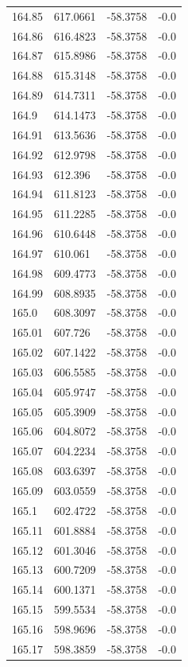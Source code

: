 \begin{table}[H]
\begin{tabular}{llll}
164.85 & 617.0661 & -58.3758 & -0.0 \\
164.86 & 616.4823 & -58.3758 & -0.0 \\
164.87 & 615.8986 & -58.3758 & -0.0 \\
164.88 & 615.3148 & -58.3758 & -0.0 \\
164.89 & 614.7311 & -58.3758 & -0.0 \\
164.9 & 614.1473 & -58.3758 & -0.0 \\
164.91 & 613.5636 & -58.3758 & -0.0 \\
164.92 & 612.9798 & -58.3758 & -0.0 \\
164.93 & 612.396 & -58.3758 & -0.0 \\
164.94 & 611.8123 & -58.3758 & -0.0 \\
164.95 & 611.2285 & -58.3758 & -0.0 \\
164.96 & 610.6448 & -58.3758 & -0.0 \\
164.97 & 610.061 & -58.3758 & -0.0 \\
164.98 & 609.4773 & -58.3758 & -0.0 \\
164.99 & 608.8935 & -58.3758 & -0.0 \\
165.0 & 608.3097 & -58.3758 & -0.0 \\
165.01 & 607.726 & -58.3758 & -0.0 \\
165.02 & 607.1422 & -58.3758 & -0.0 \\
165.03 & 606.5585 & -58.3758 & -0.0 \\
165.04 & 605.9747 & -58.3758 & -0.0 \\
165.05 & 605.3909 & -58.3758 & -0.0 \\
165.06 & 604.8072 & -58.3758 & -0.0 \\
165.07 & 604.2234 & -58.3758 & -0.0 \\
165.08 & 603.6397 & -58.3758 & -0.0 \\
165.09 & 603.0559 & -58.3758 & -0.0 \\
165.1 & 602.4722 & -58.3758 & -0.0 \\
165.11 & 601.8884 & -58.3758 & -0.0 \\
165.12 & 601.3046 & -58.3758 & -0.0 \\
165.13 & 600.7209 & -58.3758 & -0.0 \\
165.14 & 600.1371 & -58.3758 & -0.0 \\
165.15 & 599.5534 & -58.3758 & -0.0 \\
165.16 & 598.9696 & -58.3758 & -0.0 \\
165.17 & 598.3859 & -58.3758 & -0.0 \\

\end{tabular}
\end{table}
